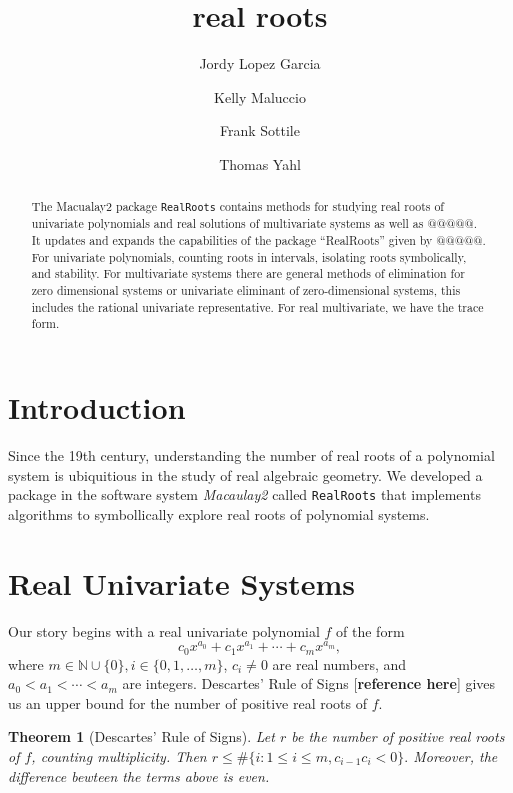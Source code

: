 \documentclass[12pt]{amsart}
\title{real roots}
\author[J.~Lopez Garcia]{Jordy Lopez Garcia}
\author[K.~Maluccio]{Kelly Maluccio}
\author[F.~Sottile]{Frank Sottile}
\author[T.~Yahl]{Thomas Yahl}
\newtheorem{theorem}{Theorem}
\theoremstyle{definition}
\newcommand{\NN}{\mathbb{N}}
\begin{document}
%
%

\begin{abstract}
The Macualay2 package \texttt{RealRoots} contains methods for studying real roots of univariate polynomials and real solutions of multivariate systems as well as @@@@@. It updates and expands the capabilities of the package ``RealRoots'' given by @@@@@. For univariate polynomials, counting roots in intervals, isolating roots symbolically, and stability. For multivariate systems there are general methods of elimination for zero dimensional systems or univariate eliminant of zero-dimensional systems, this includes the rational univariate representative. For real multivariate, we have the trace form. 
\end{abstract}

\maketitle


\section*{Introduction}

Since the 19th century, understanding the number of real roots of a polynomial system is ubiquitious in the study of real algebraic geometry. We developed a package in the software system \textit{Macaulay2} called \texttt{RealRoots} that implements algorithms to symbollically explore real roots of polynomial systems.


\section{Real Univariate Systems}

Our story begins with a real univariate polynomial $f$ of the form $$c_{0}x^{a_{0}} + c_{1}x^{a_{1}} + \cdots + c_{m}x^{a_{m}},$$ where $m\in \NN\cup\{0\}, i\in\{0,1,\dots, m\}$, $c_{i} \neq 0$ are real numbers, and $a_{0} < a_{1} < \cdots < a_{m}$ are integers. Descartes' Rule of Signs [\textbf{reference here}] gives us an upper bound for the number of positive real roots of $f$.

\begin{theorem}[Descartes' Rule of Signs]Let $r$ be the number of positive real roots of $f$, counting multiplicity. Then $r\leq \#\{i:1\leq i\leq m, c_{i-1}c_{i}<0\}.$ Moreover, the difference bewteen the terms above is even.\end{theorem}
\end{document}
